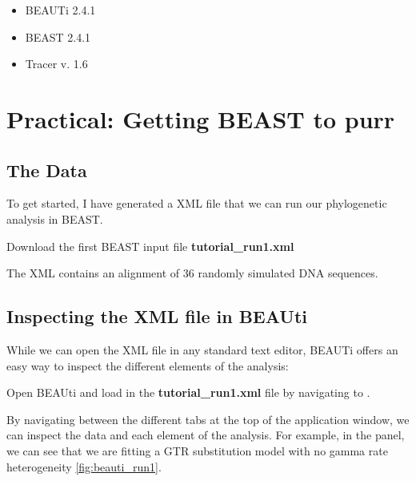 \documentclass[11pt]{article}
\begin{document}
\begin{itemize}
\item BEAUTi 2.4.1 
\item BEAST 2.4.1 
\item Tracer v. 1.6 
\end{itemize}


\newpage
\section{Practical: Getting BEAST to purr}


\bigskip
\subsection{The Data}

To get started, I have generated a XML file that we can run our phylogenetic analysis in BEAST.

\begin{framed}
Download the first BEAST input file \textbf{tutorial\_run1.xml}
\end{framed}

The XML contains an alignment of 36 randomly simulated DNA sequences. 

\bigskip
\subsection{Inspecting the XML file in BEAUti}

While we can open the XML file in any standard text editor, BEAUTi offers an easy way to inspect the different elements of the analysis: 

\begin{framed}
Open BEAUti and load in the \textbf{tutorial\_run1.xml} file by navigating to .
\end{framed}

By navigating between the different tabs at the top of the application window, we can inspect the data and each element of the analysis. For example, in the  panel, we can see that we are fitting a GTR substitution model with no gamma rate heterogeneity \ref{fig:beauti_run1}.
\end{document}
